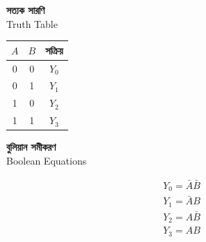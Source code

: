 
\par\begingroup


\begin{minipage}[t]{0.29\textwidth}
\centering

\textbf{সত্যক সারণি}\\[-1mm]
{\footnotesize \textenglish{Truth Table}}

\vspace{4mm}

{\renewcommand{\arraystretch}{1.24}

\begin{tabular}{|c|c|c|}
\hline
\rowcolor{ICTLightBlue}
\(A\) & \(B\) & \textbf{সক্রিয়} \\
\hline
0 & 0 & \(Y_0\) \\ \hline
0 & 1 & \(Y_1\) \\ \hline
1 & 0 & \(Y_2\) \\ \hline
1 & 1 & \(Y_3\) \\ \hline
\end{tabular}

}

\end{minipage}
\hfill
\begin{minipage}[t]{0.24\textwidth}
\centering

\textbf{বুলিয়ান সমীকরণ}\\[-1mm]
{\footnotesize \textenglish{Boolean Equations}}

\vspace{3mm}

\[
\begin{array}{c}
Y_0=\bar A\bar B\\[2.2mm]
Y_1=\bar A B\\[2.2mm]
Y_2=A\bar B\\[2.2mm]
Y_3=AB
\end{array}
\]

\end{minipage}
\hfill
